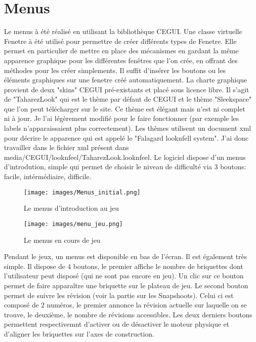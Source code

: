 \documentclass[frenchb,twoside]{EPURapport}
\begin{document}
    \section{Menus}
        Le menus à été réalisé en utilisant la bibliothèque CEGUI. Une classe
        virtuelle Fenetre à été utilisé pour permettre de créer différents
        types de Fenetre. Elle permet en particulier de mettre en place des
        mécanismes en gardant la même apparence graphique pour les différentes
        fenêtres que l'on crée, en offrant des méthodes pour les créer
        simplements. Il suffit d'insérer les boutons ou les éléments graphiques
        sur une fenetre créé automatiquement.
        La charte graphique provient de deux "skins" CEGUI pré-existants et
        placé sous licence libre. Il s'agit de "TaharezLook" qui est le thème
        par défaut de CEGUI et le thème "Sleekspace" que l'on peut télécharger
        sur le site. Ce thème est élégant mais n'est ni complet ni à jour. Je
        l'ai légèrement modifié pour le faire fonctionner (par exemple les
        labels n'apparaissaient plus correctement). Les thèmes utilisent un
        document xml pour décrire le apparence qui est appelé le "Falagard
        looknfell system". J'ai donc travailler dans le fichier xml présent
        dans media/CEGUI/looknfeel/TaharezLook.looknfeel.
        Le logiciel dispose d'un menus d'introdution, simple qui permet de
        choisir le niveau de difficulté via 3 boutons: facile, intérmédiaire,
        difficile.
		\begin{figure}[h]
			\centering
			\texttt{[image: images/Menus\_initial.png]}
			\caption{\label{fig:menus_initial}Le menus d'introduction au jeu}
		\end{figure}
		\begin{figure}[h]
			\centering
			\texttt{[image: images/menu\_jeu.png]}
			\caption{\label{fig:menu_jeu}Le menus en cours de jeu}
		\end{figure}      
        Pendant le jeux, un menus est disponible en bas de l'écran. Il est
        également très simple. Il dispose de 4 boutons, le premier affiche le
        nombre de briquettes dont l'utilisateur peut disposé (qui ne sont pas
        encore en jeu). Un clic sur ce bouton permet de faire apparaître une
        briquette sur le plateau de jeu. Le second bouton permet de suivre les
        révision (voir la partie sur les Snapshoots). Celui ci est composé de 2
        numéros, le premier annonce la révision actuelle sur laquelle on se
        trouve, le deuxième, le nombre de révisions accessibles. Les deux
        derniers boutons permettent respectivemnt d'activer ou de désactiver le
        moteur physique et d'aligner les briquettes sur l'axes de construction.
\end{document}
